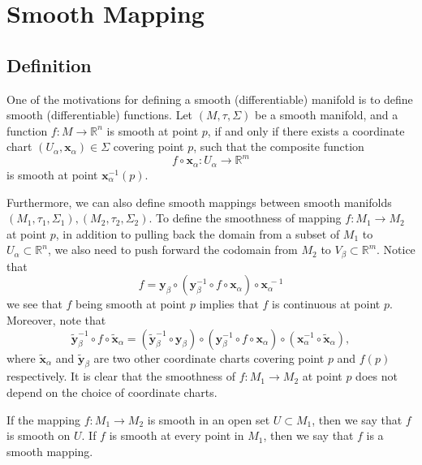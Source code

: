 \documentclass{report}
\begin{document}
\chapter{Smooth Mapping}
\section{Definition}
One of the motivations for defining a smooth (differentiable) manifold is to define smooth (differentiable) functions. Let $(M,\tau,\Sigma)$ be a smooth manifold, and a function $f:M\to \mathbb{R}^n$ is smooth at point $p$, if and only if there exists a coordinate chart $(U_\alpha,\mathbf{x}_\alpha)\in\Sigma$ covering point $p$, such that the composite function
$$
f\circ \mathbf{x}_\alpha:U_\alpha\longrightarrow \mathbb{R}^m
$$
is smooth at point $\mathbf{x}^{-1}_\alpha(p)$.

Furthermore, we can also define smooth mappings between smooth manifolds $(M_1,\tau_1,\Sigma_1), (M_2,\tau_2,\Sigma_2)$. To define the smoothness of mapping $f:M_1\to M_2$ at point $p$, in addition to pulling back the domain from a subset of $M_1$ to $U_\alpha\subset\mathbb{R}^n$, we also need to push forward the codomain from $M_2$ to $V_\beta\subset\mathbb{R}^m$.
Notice that
\[
    f = \mathbf{y}_\beta\circ(\mathbf{y}^{-1}_\beta \circ f\circ \mathbf{x}_\alpha)\circ\mathbf{x}^{\hspace{2pt}-1}_\alpha
\]
we see that $f$ being smooth at point $p$ implies that $f$ is continuous at point $p$.
Moreover, note that 
\[
    \tilde{\mathbf{y}}^{-1}_\beta \circ f\circ \tilde{\mathbf{x}}_\alpha=(\tilde{\mathbf{y}}^{-1}_\beta\circ\mathbf{y}_\beta) \circ(\mathbf{y}^{-1}_\beta \circ f\circ \mathbf{x}_\alpha)\circ(\mathbf{x}^{-1}_\alpha\circ \tilde{\mathbf{x}}_\alpha),
\]
where $\tilde{\mathbf{x}}_\alpha$ and $\tilde{\mathbf{y}}_\beta$ are two other coordinate charts covering point $p$ and $f(p)$ respectively. It is clear that the smoothness of $f:M_1\to M_2$ at point $p$ does not depend on the choice of coordinate charts.

If the mapping $f:M_1\to M_2$ is smooth in an open set $U\subset M_1$, then we say that $f$ is smooth on $U$. If $f$ is smooth at every point in $M_1$, then we say that $f$ is a smooth mapping.
\end{document}
